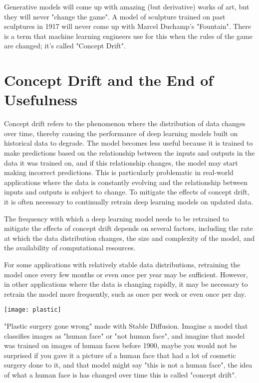 Generative models will come up with amazing (but derivative) works of art, but they will never "change the game". A model of sculpture trained on past sculptures in 1917 will never come up with Marcel Duchamp’s "Fountain". There is a term that machine learning engineers use for this when the rules of the game are changed; it’s called "Concept Drift".

\section{Concept Drift and the End of Usefulness}

Concept drift refers to the phenomenon where the distribution of data changes over time, thereby causing the performance of deep learning models built on historical data to degrade. The model becomes less useful because it is trained to make predictions based on the relationship between the inputs and outputs in the data it was trained on, and if this relationship changes, the model may start making incorrect predictions. This is particularly problematic in real-world applications where the data is constantly evolving and the relationship between inputs and outputs is subject to change. To mitigate the effects of concept drift, it is often necessary to continually retrain deep learning models on updated data.

The frequency with which a deep learning model needs to be retrained to mitigate the effects of concept drift depends on several factors, including the rate at which the data distribution changes, the size and complexity of the model, and the availability of computational resources.

For some applications with relatively stable data distributions, retraining the model once every few months or even once per year may be sufficient. However, in other applications where the data is changing rapidly, it may be necessary to retrain the model more frequently, such as once per week or even once per day.

\begin{pdf}
\begin{marginfigure}[-5.5cm]
        \texttt{[image: plastic]}
        \caption{"Plastic surgery gone wrong" made with Stable Diffusion. Imagine a model that classifies images as "human face" or "not human face", and imagine that model was trained on images of human faces before 1900, maybe you would not be surprised if you gave it a picture of a human face that had a lot of cosmetic surgery done to it, and that model might say "this is not a human face", the idea of what a human face is has changed over time this is called "concept drift".}
\end{marginfigure}
\end{pdf}

